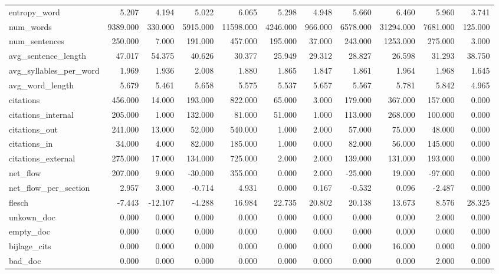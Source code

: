 \begin{tabular}{lrrrrrrrrrr}
\cline{1-11}
entropy\_word & 5.207 & 4.194 & 5.022 & 6.065 & 5.298 & 4.948 & 5.660 & 6.460 & 5.960 & 3.741 \\
\cline{1-11}
num\_words & 9389.000 & 330.000 & 5915.000 & 11598.000 & 4246.000 & 966.000 & 6578.000 & 31294.000 & 7681.000 & 125.000 \\
\cline{1-11}
num\_sentences & 250.000 & 7.000 & 191.000 & 457.000 & 195.000 & 37.000 & 243.000 & 1253.000 & 275.000 & 3.000 \\
\cline{1-11}
avg\_sentence\_length & 47.017 & 54.375 & 40.626 & 30.377 & 25.949 & 29.312 & 28.827 & 26.598 & 31.293 & 38.750 \\
\cline{1-11}
avg\_syllables\_per\_word & 1.969 & 1.936 & 2.008 & 1.880 & 1.865 & 1.847 & 1.861 & 1.964 & 1.968 & 1.645 \\
\cline{1-11}
avg\_word\_length & 5.679 & 5.461 & 5.658 & 5.575 & 5.537 & 5.657 & 5.567 & 5.781 & 5.842 & 4.965 \\
\cline{1-11}
citations & 456.000 & 14.000 & 193.000 & 822.000 & 65.000 & 3.000 & 179.000 & 367.000 & 157.000 & 0.000 \\
\cline{1-11}
citations\_internal & 205.000 & 1.000 & 132.000 & 81.000 & 51.000 & 1.000 & 113.000 & 268.000 & 100.000 & 0.000 \\
\cline{1-11}
citations\_out & 241.000 & 13.000 & 52.000 & 540.000 & 1.000 & 2.000 & 57.000 & 75.000 & 48.000 & 0.000 \\
\cline{1-11}
citations\_in & 34.000 & 4.000 & 82.000 & 185.000 & 1.000 & 0.000 & 82.000 & 56.000 & 145.000 & 0.000 \\
\cline{1-11}
citations\_external & 275.000 & 17.000 & 134.000 & 725.000 & 2.000 & 2.000 & 139.000 & 131.000 & 193.000 & 0.000 \\
\cline{1-11}
net\_flow & 207.000 & 9.000 & -30.000 & 355.000 & 0.000 & 2.000 & -25.000 & 19.000 & -97.000 & 0.000 \\
\cline{1-11}
net\_flow\_per\_section & 2.957 & 3.000 & -0.714 & 4.931 & 0.000 & 0.167 & -0.532 & 0.096 & -2.487 & 0.000 \\
\cline{1-11}
flesch & -7.443 & -12.107 & -4.288 & 16.984 & 22.735 & 20.802 & 20.138 & 13.673 & 8.576 & 28.325 \\
\cline{1-11}
unkown\_doc & 0.000 & 0.000 & 0.000 & 0.000 & 0.000 & 0.000 & 0.000 & 0.000 & 2.000 & 0.000 \\
\cline{1-11}
empty\_doc & 0.000 & 0.000 & 0.000 & 0.000 & 0.000 & 0.000 & 0.000 & 0.000 & 0.000 & 0.000 \\
\cline{1-11}
bijlage\_cits & 0.000 & 0.000 & 0.000 & 0.000 & 0.000 & 0.000 & 0.000 & 16.000 & 0.000 & 0.000 \\
\cline{1-11}
bad\_doc & 0.000 & 0.000 & 0.000 & 0.000 & 0.000 & 0.000 & 0.000 & 0.000 & 2.000 & 0.000 \\
\cline{1-11}
\bottomrule
\end{tabular}
